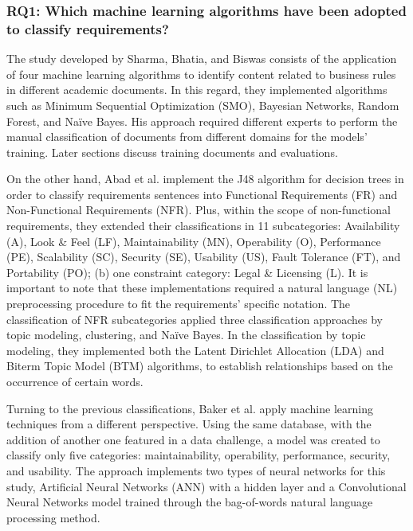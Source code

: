 \documentclass[conference]{IEEEtran}
\begin{document}
\subsubsection{RQ1: Which machine learning algorithms have been adopted to classify requirements?}

The study developed by Sharma, Bhatia, and Biswas \cite{6779538} consists of the application of four machine learning algorithms to identify content related to business rules in different academic documents. In this regard, they implemented algorithms such as Minimum Sequential Optimization (SMO), Bayesian Networks, Random Forest, and Naïve Bayes. His approach required different experts to perform the manual classification of documents from different domains for the models' training. Later sections discuss training documents and evaluations.

On the other hand, Abad et al. \cite{8049172} implement the J48 algorithm for decision trees in order to classify requirements sentences into Functional Requirements (FR) and Non-Functional Requirements (NFR). Plus, within the scope of non-functional requirements, they extended their classifications in 11 subcategories: Availability (A), Look \& Feel (LF), Maintainability (MN), Operability (O), Performance (PE), Scalability (SC), Security (SE), Usability (US), Fault Tolerance (FT), and Portability (PO); (b) one constraint category: Legal \& Licensing (L). It is important to note that these implementations required a natural language (NL) preprocessing procedure to fit the requirements' specific notation. The classification of NFR subcategories applied three classification approaches by topic modeling, clustering, and Naïve Bayes. In the classification by topic modeling, they implemented both the Latent Dirichlet Allocation (LDA) and Biterm Topic Model (BTM) algorithms, to establish relationships based on the occurrence of certain words.

Turning to the previous classifications, Baker et al. \cite{8754214} apply machine learning techniques from a different perspective. Using the same database, with the addition of another one featured in a data challenge, a model was created to classify only five categories: maintainability, operability, performance, security, and usability. The approach implements two types of neural networks for this study, Artificial Neural Networks (ANN) with a hidden layer and a Convolutional Neural Networks model trained through the bag-of-words natural language processing method.
\end{document}
